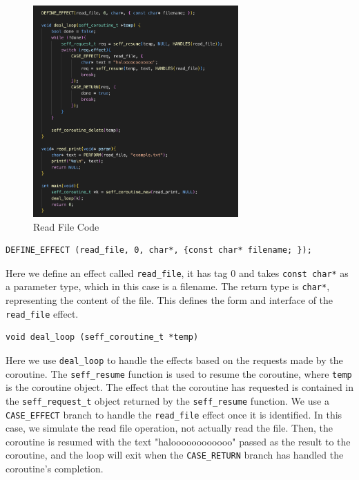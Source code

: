 \documentclass[logo,bsc,singlespacing,parskip]{infthesis}
\begin{document}
\begin{figure}[H]
    \centering
    \includegraphics[width=0.7\textwidth]{image.png}
    \caption{Read File Code}
    \label{fig:enter-label}
\end{figure}

\begin{lstlisting}
DEFINE_EFFECT (read_file, 0, char*, {const char* filename; });
\end{lstlisting}

Here we define an effect called \texttt{read\_file}, it has tag 0 and takes \texttt{const char*} as a parameter type, which in this case is a filename. The return type is \texttt{char*}, representing the content of the file. This defines the form and interface of the \texttt{read\_file} effect.

\begin{lstlisting}
void deal_loop (seff_coroutine_t *temp)
\end{lstlisting}

Here we use \texttt{deal\_loop} to handle the effects based on the requests made by the coroutine. The \texttt{seff\_resume} function is used to resume the coroutine, where \texttt{temp} is the coroutine object. The effect that the coroutine has requested is contained in the \texttt{seff\_request\_t} object returned by the \texttt{seff\_resume} function. We use a \texttt{CASE\_EFFECT} branch to handle the \texttt{read\_file} effect once it is identified. In this case, we simulate the read file operation, not actually read the file. Then, the coroutine is resumed with the text "haloooooooooooo" passed as the result to the coroutine, and the loop will exit when the \texttt{CASE\_RETURN} branch has handled the coroutine's completion.
\end{document}
